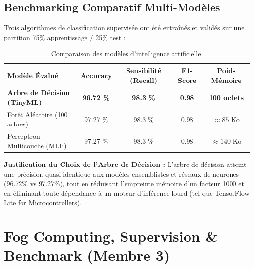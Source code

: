 \documentclass[11pt,a4paper]{report}
\begin{document}
\section{Benchmarking Comparatif Multi-Modèles}
Trois algorithmes de classification supervisée ont été entraînés et validés sur une partition 75\% apprentissage / 25\% test :

\begin{table}[H]
    \centering
    \begin{tabular}{lcccc}
        \toprule
        \textbf{Modèle Évalué} & \textbf{Accuracy} & \textbf{Sensibilité (Recall)} & \textbf{F1-Score} & \textbf{Poids Mémoire} \\
        \midrule
        \textbf{Arbre de Décision (TinyML)} & \textbf{96.72 \%} & \textbf{98.3 \%} & \textbf{0.98} & \textbf{100 octets} \\
        Forêt Aléatoire (100 arbres) & 97.27 \% & 98.3 \% & 0.98 & $\approx 85$ Ko \\
        Perceptron Multicouche (MLP) & 97.27 \% & 98.3 \% & 0.98 & $\approx 140$ Ko \\
        \bottomrule
    \end{tabular}
    \caption{Comparaison des modèles d'intelligence artificielle.}
\end{table}

\textbf{Justification du Choix de l'Arbre de Décision :}
L'arbre de décision atteint une précision quasi-identique aux modèles ensemblistes et réseaux de neurones (96.72\% vs 97.27\%), tout en réduisant l'empreinte mémoire d'un facteur 1000 et en éliminant toute dépendance à un moteur d'inférence lourd (tel que TensorFlow Lite for Microcontrollers).

\chapter{Fog Computing, Supervision \& Benchmark (Membre 3)}
\end{document}
